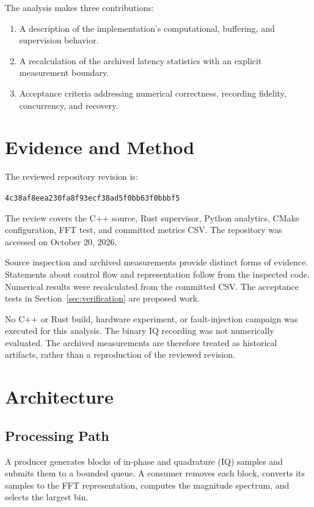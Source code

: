 \documentclass[conference]{IEEEtran}
\begin{document}
The analysis makes three contributions:
\begin{enumerate}
\item A description of the implementation's computational,
buffering, and supervision behavior.
\item A recalculation of the archived latency statistics
with an explicit measurement boundary.
\item Acceptance criteria addressing numerical correctness,
recording fidelity, concurrency, and recovery.
\end{enumerate}

\section{Evidence and Method}

The reviewed repository revision is:
\begin{center}
{\footnotesize
\texttt{4c38af8eea230fa8f93ecf38ad5f0bb63f0bbbf5}}
\end{center}

The review covers the C++ source, Rust supervisor, Python
analytics, CMake configuration, FFT test, and committed
metrics CSV. The repository was accessed on October 20, 2026.

Source inspection and archived measurements provide distinct
forms of evidence. Statements about control flow and
representation follow from the inspected code. Numerical
results were recalculated from the committed CSV.
The acceptance tests in Section~\ref{sec:verification}
are proposed work.

No C++ or Rust build, hardware experiment, or fault-injection
campaign was executed for this analysis. The binary IQ
recording was not numerically evaluated. The archived
measurements are therefore treated as historical artifacts,
rather than a reproduction of the reviewed revision.

\section{Architecture}

\subsection{Processing Path}

A producer generates blocks of in-phase and quadrature (IQ)
samples and submits them to a bounded queue. A consumer
removes each block, converts its samples to the FFT
representation, computes the magnitude spectrum, and
selects the largest bin.
\end{document}
